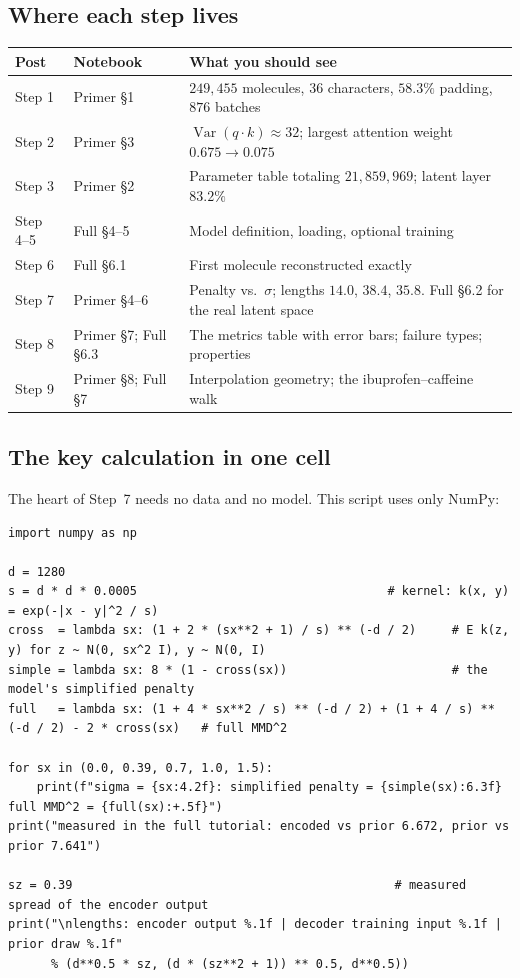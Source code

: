 \documentclass[11pt]{article}
\DeclareMathOperator{\Var}{Var}
\begin{document}
\subsection{Where each step lives}
\begin{center}
\small
\begin{tabular}{@{}llp{6.4cm}@{}}
\toprule
Post & Notebook & What you should see\\
\midrule
Step 1 & Primer \S1 & $249{,}455$ molecules, $36$ characters, $58.3\%$ padding, $876$ batches\\
Step 2 & Primer \S3 & $\Var(q\cdot k)\approx32$; largest attention weight $0.675\to0.075$\\
Step 3 & Primer \S2 & Parameter table totaling $21{,}859{,}969$; latent layer $83.2\%$\\
Step 4--5 & Full \S4--5 & Model definition, loading, optional training\\
Step 6 & Full \S6.1 & First molecule reconstructed exactly\\
Step 7 & Primer \S4--6 & Penalty vs.\ $\sigma$; lengths $14.0$, $38.4$, $35.8$. Full \S6.2 for the real latent space\\
Step 8 & Primer \S7; Full \S6.3 & The metrics table with error bars; failure types; properties\\
Step 9 & Primer \S8; Full \S7 & Interpolation geometry; the ibuprofen--caffeine walk\\
\bottomrule
\end{tabular}
\end{center}

\subsection{The key calculation in one cell}
The heart of Step~7 needs no data and no model. This script uses only NumPy:

\begin{lstlisting}
import numpy as np

d = 1280
s = d * d * 0.0005                                   # kernel: k(x, y) = exp(-|x - y|^2 / s)
cross  = lambda sx: (1 + 2 * (sx**2 + 1) / s) ** (-d / 2)     # E k(z, y) for z ~ N(0, sx^2 I), y ~ N(0, I)
simple = lambda sx: 8 * (1 - cross(sx))                       # the model's simplified penalty
full   = lambda sx: (1 + 4 * sx**2 / s) ** (-d / 2) + (1 + 4 / s) ** (-d / 2) - 2 * cross(sx)   # full MMD^2

for sx in (0.0, 0.39, 0.7, 1.0, 1.5):
    print(f"sigma = {sx:4.2f}: simplified penalty = {simple(sx):6.3f}   full MMD^2 = {full(sx):+.5f}")
print("measured in the full tutorial: encoded vs prior 6.672, prior vs prior 7.641")

sz = 0.39                                             # measured spread of the encoder output
print("\nlengths: encoder output %.1f | decoder training input %.1f | prior draw %.1f"
      % (d**0.5 * sz, (d * (sz**2 + 1)) ** 0.5, d**0.5))
\end{lstlisting}
\end{document}
